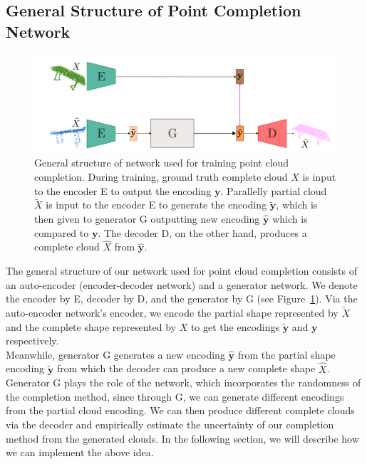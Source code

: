     \subsection{General Structure of Point Completion Network}
    \begin{figure}[htb]
      \begin{center}
      \includegraphics[width=\linewidth]{figures/general_network.png}
      \end{center}
      \caption{General structure of network used for training point cloud completion. During training, ground truth complete cloud $X$ is input to the encoder E to output the encoding $\mathbf{y}$. Parallelly partial cloud $\tilde{X}$ is input to the encoder E to generate the encoding $\mathbf{\tilde{y}}$, which is then given to generator G outputting new encoding $\mathbf{\hat{y}}$ which is compared to $\mathbf{y}$. The decoder D, on the other hand, produces a complete cloud $\hat{X}$ from  $\mathbf{\hat{y}}$.}\label{fig:gen_net}
    \end{figure}
    The general structure of our network used for point cloud completion consists of an auto-encoder (encoder-decoder network) and a generator network. We denote the encoder by E, decoder by D, and the generator by G (see Figure~\ref{fig:gen_net}). Via the auto-encoder network's encoder, we encode the partial shape represented by $\tilde{X}$ and the complete shape represented by $X$ to get the encodings $\mathbf{\tilde{y}}$ and $\mathbf{y}$ respectively. 
    \\
    Meanwhile, generator G generates a new encoding $\mathbf{\hat{y}}$ from the partial shape encoding $\mathbf{\tilde{y}}$ from which the decoder can produce a new complete shape $\hat{X}$. Generator G plays the role of the network, which incorporates the randomness of the completion method, since through G, we can generate different encodings from the partial cloud encoding. We can then produce different complete clouds via the decoder and empirically estimate the uncertainty of our completion method from the generated clouds. In the following section, we will describe how we can implement the above idea.

